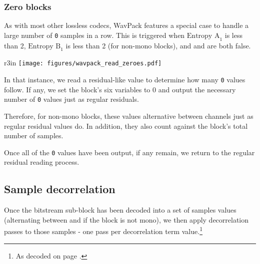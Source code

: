 \clearpage

\subsubsection{Zero blocks}

As with most other lossless codecs, WavPack features a special
case to handle a large number of \texttt{0} samples in a row.
This is triggered when $\text{Entropy A}_1$ is less than 2,
$\text{Entropy B}_1$ is less than 2 (for non-mono blocks),
and  and  are both false.

\begin{wrapfigure}[14]{r}{3in}
\texttt{[image: figures/wavpack\_read\_zeroes.pdf]}
\end{wrapfigure}

In that instance, we read a residual-like value to determine
how many \texttt{0} values follow.
If any, we set the block's six  variables to 0
and output the necessary number of \texttt{0} values just as
regular residuals.

Therefore, for non-mono blocks, these values alternative between channels
just as regular residual values do.
In addition, they also count against the block's total number of samples.

Once all of the \texttt{0} values have been output, if any
 remain, we return to the regular residual
reading process.

\clearpage

\subsection{Sample decorrelation}

Once the bitstream sub-block has been decoded into a set of
samples values (alternating between  and 
if the block is not mono), we then apply decorrelation passes
to those samples - one pass per decorrelation term value.\footnote{As
decoded on page \pageref{wavpack_decorr_terms}.}

